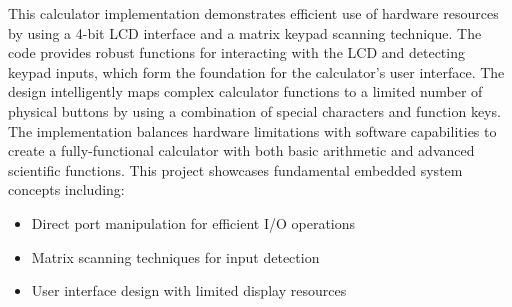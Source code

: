 \documentclass[12pt]{article}
\begin{document}
This calculator implementation demonstrates efficient use of hardware resources by using a 4-bit LCD interface and a matrix keypad scanning technique. The code provides robust functions for interacting with the LCD and detecting keypad inputs, which form the foundation for the calculator's user interface.
\newline
The design intelligently maps complex calculator functions to a limited number of physical buttons by using a combination of special characters and function keys. The implementation balances hardware limitations with software capabilities to create a fully-functional calculator with both basic arithmetic and advanced scientific functions.
\newline
This project showcases fundamental embedded system concepts including:
\begin{itemize}
\item Direct port manipulation for efficient I/O operations
\item Matrix scanning techniques for input detection
\item User interface design with limited display resources
\end{itemize}
\end{document}
